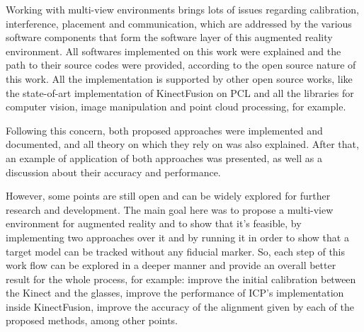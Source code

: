 \documentclass[msc, a4paper, classic, en]{ufbathesis}
\begin{document}
Working with multi-view environments brings lots of issues regarding calibration, interference, placement and communication, which are addressed by the various software components that form the software layer of this augmented reality environment. All softwares implemented on this work were explained and the path to their source codes were provided, according to the open source nature of this work. All the implementation is supported by other open source works, like the state-of-art implementation of KinectFusion on PCL and all the libraries for computer vision, image manipulation and point cloud processing, for example.

Following this concern, both proposed approaches were implemented and documented, and all theory on which they rely on was also explained. After that, an example of application of both approaches was presented, as well as a discussion about their accuracy and performance.

However, some points are still open and can be widely explored for further research and development. The main goal here was to propose a multi-view environment for augmented reality and to show that it's feasible, by implementing two approaches over it and by running it in order to show that a target model can be tracked without any fiducial marker. So, each step of this work flow can be explored in a deeper manner and provide an overall better result for the whole process, for example: improve the initial calibration between the Kinect and the glasses, improve the performance of ICP's implementation inside KinectFusion, improve the accuracy of the alignment given by each of the proposed methods, among other points.

\backmatter


\end{document}

